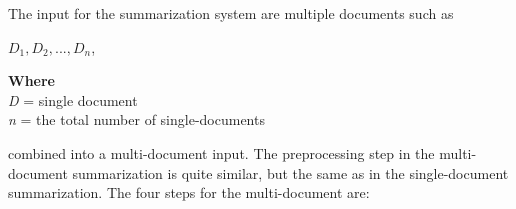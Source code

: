 The input for the summarization system are multiple documents such as 

\begin{tcolorbox}
	\begin{center}
		\(D_{1}, D_{2},..., D_{n}\),
	\end{center}
\end{tcolorbox}

\begin{tcolorbox}
	\textbf{Where} \\
	\textit{D} = single document \\ 
	\textit{n} = the total number of single-documents
\end{tcolorbox}

combined into a multi-document input.
The preprocessing step in the multi-document summarization is quite similar, but the same as in the single-document summarization. The four steps for the multi-document are:
 

